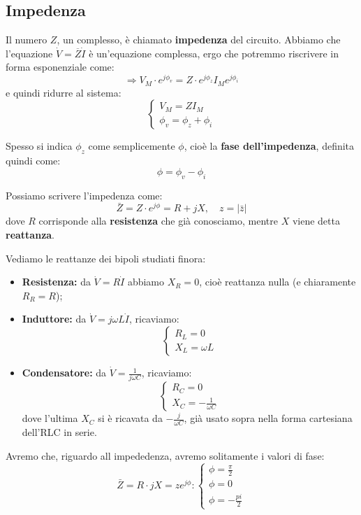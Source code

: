 \documentclass[a4paper,11pt]{article}
\begin{document}
\subsection{Impedenza}
Il numero $Z$, un complesso, è chiamato \textbf{impedenza} del circuito.
Abbiamo che l'equazione $\dot{V} = \overline{Z} \dot{I}$ è un'equazione complessa, ergo che potremmo riscrivere in forma esponenziale come:
$$
\Rightarrow V_M \cdot e^{j \phi_v} = Z \cdot e^{j \phi_z} I_M e^{j \phi_i}
$$
e quindi ridurre al sistema:
\[
	\begin{cases}
		V_M = Z I_M \\ 
		\phi_v = \phi_z + \phi_i
	\end{cases}
\]

Spesso si indica $\phi_z$ come semplicemente $\phi$, cioè la \textbf{fase dell'impedenza}, definita quindi come:
$$
\phi = \phi_v - \phi_i
$$

Possiamo scrivere l'impedenza come:
$$
\bar{Z} = Z \cdot e^{j \phi} = R + j X, \quad z = |\bar{z}|
$$
dove $R$ corrisponde alla \textbf{resistenza} che già conosciamo, mentre $X$ viene detta \textbf{reattanza}.

Vediamo le reattanze dei bipoli studiati finora:
\begin{itemize}
	\item \textbf{Resistenza:} da $\dot{V} = R \dot{I}$ abbiamo $X_R = 0$, cioè reattanza nulla (e chiaramente $R_R = R$);
	\item \textbf{Induttore:} da $\dot{V} = j \omega L \dot{I}$, ricaviamo:
		\[
			\begin{cases}
				R_L = 0	\\ 
				X_L = \omega L
			\end{cases}
		\]
	\item \textbf{Condensatore:} da $\dot{V} = \frac{1}{j \omega C}$, ricaviamo:
		\[
			\begin{cases}
				R_C = 0	\\ 
				X_C = -\frac{1}{\omega C}
			\end{cases}
		\]
		dove l'ultima $X_C$ si è ricavata da $-\frac{j}{\omega C}$, già usato sopra nella forma cartesiana dell'RLC in serie.
\end{itemize}

Avremo che, riguardo all impededenza, avremo solitamente i valori di fase:
$$
\bar{Z} = R \cdot j X = z e^{j \phi}:
	\begin{cases}
		\phi = \frac{\pi}{2} \\ 
		\phi = 0 \\ 
		\phi = -\frac{pi}{2}
	\end{cases}
$$
\end{document}
